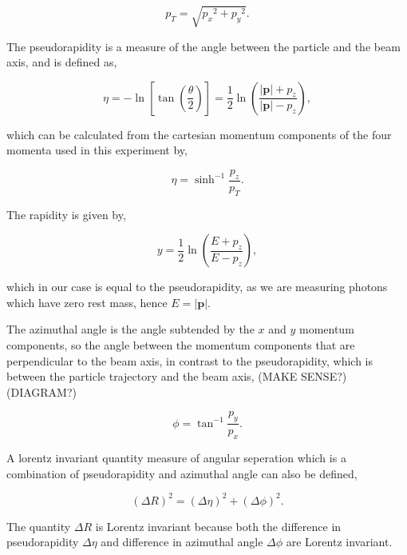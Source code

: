 \documentclass[11pt]{amsart}
\begin{document}
\begin{multicols}{2}
\begin{equation}
  \label{eq:transverse}
  p_T = \sqrt{{p_x}^2 + {p_y}^2}.
\end{equation}

The pseudorapidity is a measure of the angle between the particle and the beam axis, and is defined as,

\begin{equation}
  \label{eq:pseudorapdity2}
  \eta = -\ln{\left[\tan{\left(\frac{\theta}{2}\right)}\right]} = \frac{1}{2}\ln{\left(\frac{|\mathbf{p}|+p_z}{|\mathbf{p}|-p_z}\right)},
\end{equation}

\cite{kinematics}

which can be calculated from the cartesian momentum components of the four momenta used in this experiment by,

\begin{equation}
  \label{eq:pseudorapidity}
  \eta = \sinh^{-1} \frac{p_z}{p_T}.
\end{equation}

The rapidity is given by,

\begin{equation}
  \label{eq:rapidity}
  y = \frac{1}{2}\ln{\left(\frac{E + p_z}{E - p_z}\right)},
\end{equation}

which in our case is equal to the pseudorapidity, as we are measuring photons which have zero rest mass, hence $E = |\mathbf{p}|$.

The azimuthal angle is the angle subtended by the $x$ and $y$ momentum components, so the angle between the momentum components that are perpendicular to the beam axis, in contrast to the pseudorapidity, which is between the particle trajectory and the beam axis, (MAKE SENSE?) (DIAGRAM?)

\begin{equation}
  \label{eq:azimuthal}
  \phi = \tan^{-1} \frac{p_y}{p_x}.
\end{equation}

A lorentz invariant quantity measure of angular seperation which is a combination of pseudorapidity and azimuthal angle can also be defined,

\begin{equation}
  \label{eq:angular}
  {(\Delta R)}^2 = {(\Delta \eta)}^2 + {(\Delta \phi)}^2.
\end{equation}

The quantity $\Delta R$ is Lorentz invariant because both the difference in pseudorapidity $\Delta \eta$ and difference in azimuthal angle $\Delta \phi$ are Lorentz invariant. \cite{lorentz}


\end{multicols}
\end{document}
